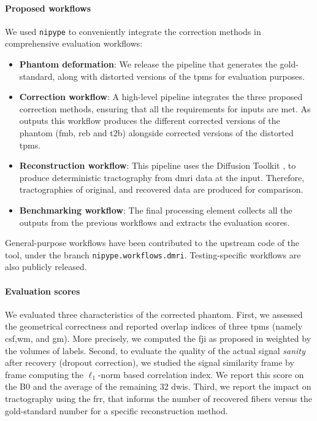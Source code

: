 \paragraph*{Proposed workflows}
We used \texttt{nipype} \cite{gorgolewski_nipype:_2011}
to conveniently integrate the correction methods in
comprehensive evaluation workflows:

\begin{itemize}
\item \textbf{Phantom deformation}: We release the pipeline
that generates the gold-standard, along with
distorted versions of the \glspl*{tpm} for
evaluation purposes.
\item \textbf{Correction workflow}: A high-level pipeline
integrates the three proposed correction methods,
ensuring that all the requirements for inputs are
met. As outputs this workflow produces the different
corrected versions of the phantom (\gls*{fmb}, \gls*{reb}
and \gls*{t2b}) alongside corrected versions of the
distorted \glspl*{tpm}.
\item \textbf{Reconstruction workflow}: This pipeline uses
the Diffusion Toolkit \cite{wang_diffusion_2007}, 
to produce deterministic tractography
from \gls*{dmri} data at the input. Therefore,
tractographies of original, and recovered data
are produced for comparison.
\item \textbf{Benchmarking workflow}: The final processing
element collects all the outputs from the previous
workflows and extracts the evaluation scores.
\end{itemize}
General-purpose 
workflows have been contributed to the upstream code
of the tool, under the branch \texttt{nipype.workflows.dmri}.
Testing-specific workflows are also publicly released.

\paragraph*{Evaluation scores}
We evaluated three characteristics of the corrected
phantom. First, we assessed the geometrical correctness
and reported overlap indices of three \glspl*{tpm} 
(namely \gls*{csf},\gls*{wm}, and \gls*{gm}).
More precisely, we computed the \gls*{fji} as 
proposed in \cite{crum_generalized_2006} weighted by 
the volumes of labels. 
Second, to evaluate the quality of the actual 
signal \emph{sanity} after recovery (dropout 
correction), we studied the signal similarity
frame by frame computing the $\ell_1$-norm
based correlation index. We report this score
on the B0 and the average of the remaining 32 
\glspl*{dwi}. Third, we report the 
impact on tractography using the \gls*{frr}, that 
informs the number of recovered fibers versus the 
gold-standard number for a specific reconstruction
method.
